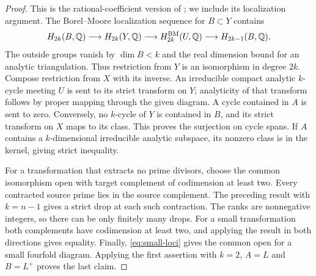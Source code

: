 \begin{proof}
This is the rational-coefficient version of
\cite[Lemma~4.1]{KahlerAuxiliary}; we include its localization argument.
The Borel--Moore localization sequence for $B\subset Y$ contains
\[
 H_{2k}(B,\mathbb{Q})\longrightarrow H_{2k}(Y,\mathbb{Q})
 \longrightarrow H_{2k}^{\mathrm{BM}}(U,\mathbb{Q})
 \longrightarrow H_{2k-1}(B,\mathbb{Q}).
\]
The outside groups vanish by $\dim B<k$ and the real dimension bound
for an analytic triangulation.  Thus restriction from $Y$ is an
isomorphism in degree $2k$.  Compose restriction from $X$ with its
inverse.  An irreducible compact analytic $k$-cycle meeting $U$ is
sent to its strict transform on $Y$; analyticity of that transform
follows by proper mapping through the given diagram.  A cycle
contained in $A$ is sent to zero.  Conversely, no $k$-cycle of $Y$ is
contained in $B$, and its strict transform on $X$ maps to its class.
This proves the surjection on cycle spans.  If $A$ contains a
$k$-dimensional irreducible analytic subspace, its nonzero class is in
the kernel, giving strict inequality.

For a transformation that extracts no prime divisors, choose the
common isomorphism open with target complement of codimension at least
two.  Every contracted source prime lies in the source complement.
The preceding result with $k=n-1$ gives a strict drop at each such
contraction.  The ranks are nonnegative integers, so there can be
only finitely many drops.  For a small transformation both complements
have codimension at least two, and applying the result in both
directions gives equality.  Finally, \eqref{eq:small-loci} gives the
common open for a small fourfold diagram.  Applying the first assertion
with $k=2$, $A=L$ and $B=L^+$ proves the last claim.
\end{proof}
